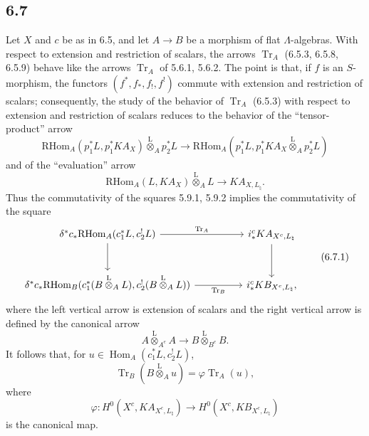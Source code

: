 \documentclass[11pt]{article}
\DeclareMathOperator{\Hom}{Hom}
\providecommand{\RHom}{\mathrm{RHom}}
\providecommand{\Tr}{\operatorname{Tr}}
\providecommand{\Tr}{\operatorname{Tr}}
\providecommand{\lten}{\overset{\mathrm L}{\otimes}}
\providecommand{\Tr}{\operatorname{Tr}}
\providecommand{\RHom}{\mathrm{RHom}}
\providecommand{\Hom}{\operatorname{Hom}}
\providecommand{\lten}{\overset{\mathrm L}{\otimes}}
\providecommand{\RHom}{\mathrm R\mathcal{H}om}
\providecommand{\lten}{\overset{\mathrm L}{\otimes}}
\providecommand{\Tr}{\operatorname{Tr}}
\providecommand{\lten}{\overset{\mathrm L}{\otimes}}
\providecommand{\lten}{\overset{\mathrm L}{\otimes}}
\providecommand{\lten}{\overset{\mathrm L}{\otimes}}
\providecommand{\RHom}{\mathrm{RHom}}
\begin{document}
\subsection*{6.7}
Let $X$ and $c$ be as in 6.5, and let $A\to B$ be a morphism of flat $\Lambda$-algebras. With respect to extension and restriction of scalars, the arrows $\Tr_A$ (6.5.3, 6.5.8, 6.5.9) behave like the arrows $\Tr_A$ of 5.6.1, 5.6.2. The point is that, if $f$ is an $S$-morphism, the functors $(f^*,f_*,f_!,f^!)$ commute with extension and restriction of scalars; consequently, the study of the behavior of $\Tr_A$ (6.5.3) with respect to extension and restriction of scalars reduces to the behavior of the “tensor-product” arrow
\[
\RHom_A(p_1^*L,p_1^*KA_X)\lten_Ap_2^*L
\longrightarrow
\RHom_A(p_1^*L,p_1^*KA_X\lten_Ap_2^*L)
\]
and of the “evaluation” arrow
\[
\RHom_A(L,KA_X)\lten_A L\longrightarrow KA_{X,L_{\natural}}.
\]
Thus the commutativity of the squares 5.9.1, 5.9.2 implies the commutativity of the square
\begin{equation}
\begin{tikzcd}[column sep=huge,row sep=large]
\delta^*c_*\RHom_A(c_1^*L,c_2^!L) \arrow[r,"\Tr_A"] \arrow[d]
& i_*^cKA_{X^c,L_{\natural}} \arrow[d]\\
\delta^*c_*\RHom_B(c_1^*(B\lten_A L),c_2^!(B\lten_A L)) \arrow[r,"\Tr_B"']
& i_*^cKB_{X^c,L_{\natural}},
\end{tikzcd}
\tag{6.7.1}
\end{equation}
where the left vertical arrow is extension of scalars and the right vertical arrow is defined by the canonical arrow
\[
A\lten_{A^e}A\longrightarrow B\lten_{B^e}B.
\]
It follows that, for $u\in\Hom_A(c_1^*L,c_2^!L)$,
\begin{equation}
\Tr_B(B\lten_Au)=\varphi\Tr_A(u),
\tag{6.7.2}
\end{equation}
where
\[
\varphi:H^0(X^c,KA_{X^c,L_{\natural}})\longrightarrow H^0(X^c,KB_{X^c,L_{\natural}})
\]
is the canonical map.
\end{document}
